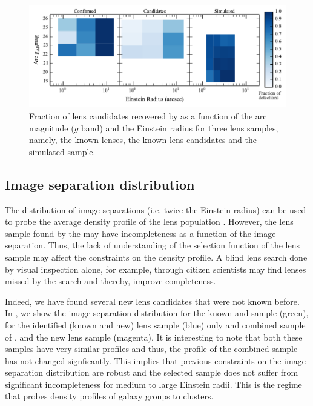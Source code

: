 \documentclass[useAMS,usenatbib,a4paper]{mn2e}
\begin{document}
\begin{figure}
\begin{center}
\includegraphics[scale=1.0]{sw-cfhtls-figs/comp_reinst_mag.pdf}
\caption{ \label{fig:compre} Fraction of lens candidates recovered by \sw as a
function of the arc magnitude ($g$ band) and the Einstein radius for three lens
samples, namely, the known lenses, the known lens candidates and the simulated
sample. }
\end{center}
\end{figure}


\subsection{Image separation distribution}
\label{sec:results:isd}

The distribution of image separations (i.e. twice the Einstein radius)
can be used to probe the average density profile of the lens population
\citep{Oguri2006,More2012}.  However, the lens sample found by the \af
may have incompleteness as a function of the image separation. Thus, the
lack of understanding of the selection function of the lens sample may
affect the constraints on the density profile. A blind lens search done
by visual inspection alone, for example, through \sw citizen scientists may find
lenses missed by the \af search and thereby, improve completeness.

Indeed, we have found several new lens candidates that were not known
before. In , we show the image separation distribution for
the known \rf and \af sample (green), for the \sw identified (known and
new) lens sample (blue) only and combined \cfhtls sample of \rf, \af and
the new \sw lens sample (magenta). It is interesting to note that both
these samples have very similar profiles and thus, the profile of the
combined sample has not changed signficantly. This implies that previous
constraints on the image separation distribution are robust and the \af
selected sample does not suffer from significant incompleteness for
medium to large Einstein radii. This is the regime that probes density
profiles of galaxy groups to clusters.
\end{document}
